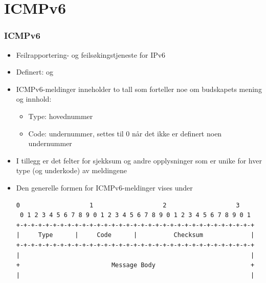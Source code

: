 \section{ICMPv6}
\begin{frame}[fragile]
  \frametitle{ICMPv6}
  \begin{itemize}
  \item Feilrapportering- og feilsøkingstjeneste for IPv6
  \item Definert:  og 
  \item ICMPv6-meldinger inneholder to tall som forteller noe om
    budskapets mening og innhold:
    \begin{itemize}
    \item Type: hovednummer
    \item Code: undernummer, settes til 0 når det ikke er definert
      noen undernummer
    \end{itemize}
  \item I tillegg er det felter for sjekksum og andre opplysninger som
    er unike for hver type (og underkode) av meldingene
  \item Den generelle formen for ICMPv6-meldinger vises under
\begin{Verbatim}[fontsize=\tiny]
 0                   1                   2                   3
 0 1 2 3 4 5 6 7 8 9 0 1 2 3 4 5 6 7 8 9 0 1 2 3 4 5 6 7 8 9 0 1
+-+-+-+-+-+-+-+-+-+-+-+-+-+-+-+-+-+-+-+-+-+-+-+-+-+-+-+-+-+-+-+-+
|     Type      |     Code      |          Checksum             |
+-+-+-+-+-+-+-+-+-+-+-+-+-+-+-+-+-+-+-+-+-+-+-+-+-+-+-+-+-+-+-+-+
|                                                               |
+                         Message Body                          +
|                                                               |
\end{Verbatim}
  \end{itemize}
\end{frame}

